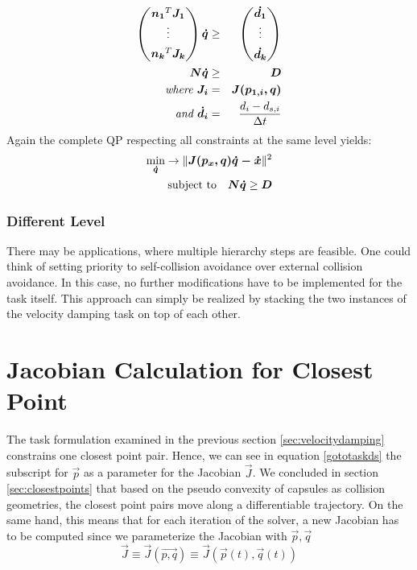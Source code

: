 \begin{eqnarray}
\begin{pmatrix}
 \vec{n_1}^T\vec{J_1} \\
 \vdots \\[0.5em]
 \vec{n_k}^T\vec{J_k}
\end{pmatrix} 
 \vec{\dot{q}} &\geq &
 \begin{pmatrix}
 \vec{\dot{d_1}} \\
 \vdots \\[0.5em]
 \vec{\dot{d_k}}
\end{pmatrix} \notag \\
\vec{N} \vec{\dot{q}} &\geq & \vec{D} \notag \\
\textit{where } \vec{J_i} &=& \vec{J(p_{1,i},q)} \notag \\
\textit{and } \vec{\dot{d_i}} &=& \frac{d_i - d_{s,i}}{\Delta t}
\end{eqnarray}
Again the complete QP respecting all constraints at the same level yields:
\begin{eqnarray}
\underset{\vec{\dot{q}}}{\text{min}} \rightarrow \Vert \vec{J(p_x,q) \dot{q} - \dot{x}} \Vert^2  \notag \\
\text{subject to} \quad \vec{N}\vec{\dot{q}} \geq \vec{D} \label{eqn:taskdampconstraintsamelevel}
\end{eqnarray}


\subsubsection*{Different Level}
There may be applications, where multiple hierarchy steps are feasible. One could think of setting priority to self-collision avoidance over external collision avoidance. In this case, no further modifications have to be implemented for the task itself. This approach can simply be realized by stacking the two instances of the velocity damping task on top of each other.

\section{Jacobian Calculation for Closest Point}
 \label{sec:jacobian}
The task formulation examined in the previous section \ref{sec:velocitydamping} constrains one closest point pair. Hence, we can see in equation \ref{gototaskds} the subscript for $\vec{p}$ as a parameter for the Jacobian $\vec{J}$. We concluded in section \ref{sec:closestpoints} that based on the pseudo convexity of capsules as collision geometries, the closest point pairs move along a differentiable trajectory. On the same hand, this means that for each iteration of the solver, a new Jacobian has to be computed since we parameterize the Jacobian with $\vec{p},\vec{q}$
\begin{equation}
\vec{J} \equiv \vec{J}(\vec{p,q}) \equiv \vec{J}(\vec{p}(t),\vec{q}(t))
\end{equation}

